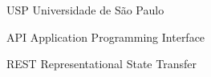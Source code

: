 \documentclass[
	12pt,				%
	openright,		%
	twoside,			%
	a4paper,			%
	english,				%
	french,				%
	spanish,			%
	brazil,				%
	]{abntex2}
\begin{document}

\frenchspacing 


\imprimircapa

\imprimirfolhaderosto



\listoftables*
\cleardoublepage

\begin{siglas}
  \item[USP] Universidade de São Paulo
  \item[API] Application Programming Interface
  \item[REST] Representational State Transfer
\end{siglas}


\tableofcontents*
\cleardoublepage


\textual

\end{document}

